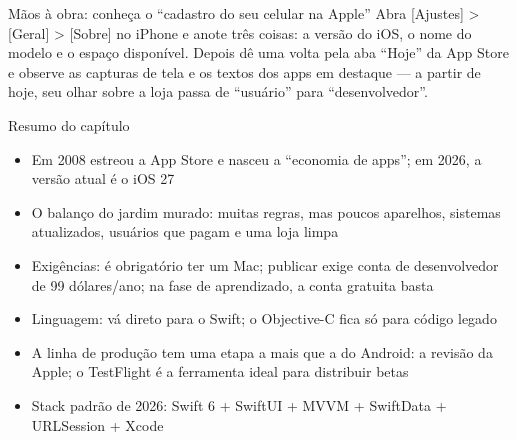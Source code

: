 \begin{tcbpractice}{Mãos à obra: conheça o “cadastro do seu celular na Apple”}
Abra [Ajustes] > [Geral] > [Sobre] no iPhone e anote três coisas: a versão do iOS, o nome do modelo e o espaço disponível. Depois dê uma volta pela aba “Hoje” da App Store e observe as capturas de tela e os textos dos apps em destaque — a partir de hoje, seu olhar sobre a loja passa de “usuário” para “desenvolvedor”.

\end{tcbpractice}

\begin{tcbsummary}{Resumo do capítulo}
\begin{itemize}
  \item Em 2008 estreou a App Store e nasceu a “economia de apps”; em 2026, a versão atual é o iOS 27
  \item O balanço do jardim murado: muitas regras, mas poucos aparelhos, sistemas atualizados, usuários que pagam e uma loja limpa
  \item Exigências: é obrigatório ter um Mac; publicar exige conta de desenvolvedor de 99 dólares/ano; na fase de aprendizado, a conta gratuita basta
  \item Linguagem: vá direto para o Swift; o Objective-C fica só para código legado
  \item A linha de produção tem uma etapa a mais que a do Android: a revisão da Apple; o TestFlight é a ferramenta ideal para distribuir betas
  \item Stack padrão de 2026: Swift 6 + SwiftUI + MVVM + SwiftData + URLSession + Xcode
\end{itemize}

\end{tcbsummary}

